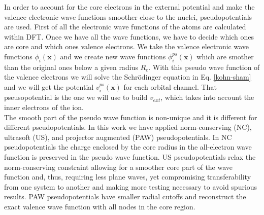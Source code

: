In order to account for the core electrons in the external potential and make the valence electronic wave functions smoother close to the nuclei, pseudopotentials are used. First of all the electronic wave functions of the 
atoms are calculated within DFT. Once we have all the wave functions, we have to decide which ones are core and which ones valence electrons. We take the valence electronic wave functions $\phi_{i}(\mathbf{x})$ and we 
create new wave functions $\phi_{i}^{ps}(\mathbf{x})$ which are smother than the original ones below a given radius $R_{c}$. With this pseudo wave function of the valence electrons we will solve the Schr\"{o}dinger equation in 
Eq. \ref{kohn-sham} and we will get the potential $v_{i}^{ps}(\mathbf{x})$ for each orbital channel. That pseusopotential is the one we will use to build $v_{ext}$, which takes into account the inner electrons of 
the ion. \\

The smooth part of the pseudo wave function is non-unique and it is different for different pseudopotentials. In this work we have applied 
norm-conserving\cite{hamann1979norm,troullier1991efficient} (NC), ultrasoft\cite{vanderbilt1990soft} (US), and projector augmented\cite{blochl1994projector} (PAW) pseudopotentials. In NC pseudopotentials the 
charge enclosed by the core radius in the all-electron wave function is preserved in the pseudo wave function. US pseudopotentials relax the norm-conserving constraint allowing for a smoother core 
part of the wave function and, thus, requiring less plane waves, yet compromising transferability from one system to another and making more testing necessary to avoid spurious results. PAW pseudopotentials have 
smaller radial cutoffs and reconstruct the exact valence wave function with all nodes in the core region.
